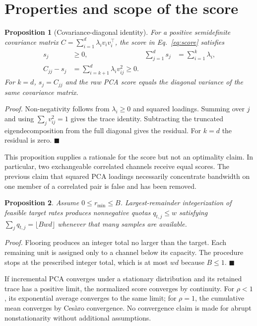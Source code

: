 \documentclass[12pt]{article}
\newtheorem{proposition}{Proposition}
\renewenvironment{proof}[1][Proof]{\noindent\textit{#1.}\space}{\hfill$\blacksquare$\par}
\begin{document}
\section{Properties and scope of the score}

\begin{proposition}[Covariance-diagonal identity]
For a positive semidefinite covariance matrix
$C=\sum_{i=1}^{d}\lambda_i v_iv_i^\top$, the score in
Eq.~\eqref{eq:score} satisfies
\begin{align}
 s_j&\geq0, & \sum_{j=1}^{d}s_j&=\sum_{i=1}^{k}\lambda_i,\\
 C_{jj}-s_j&=\sum_{i=k+1}^{d}\lambda_i v_{ij}^{2}\geq0.
\end{align}
For $k=d$, $s_j=C_{jj}$ and the raw PCA score equals the diagonal variance of the same covariance matrix.
\end{proposition}
\begin{proof}
Non-negativity follows from $\lambda_i\geq0$ and squared loadings. Summing over
$j$ and using $\sum_jv_{ij}^2=1$ gives the trace identity. Subtracting the
truncated eigendecomposition from the full diagonal gives the residual. For
$k=d$ the residual is zero.
\end{proof}

This proposition supplies a rationale for the score but not an optimality
claim. In particular, two exchangeable correlated channels receive equal
scores. The previous claim that squared PCA loadings necessarily concentrate
bandwidth on one member of a correlated pair is false and has been removed.

\begin{proposition}
Assume $0\leq r_{\min}\leq B$. Largest-remainder integerization of feasible
target rates produces nonnegative quotas $q_{t,j}\leq w$ satisfying
$\sum_jq_{t,j}=\lfloor Bwd\rfloor$ whenever that many samples are available.
\end{proposition}
\begin{proof}
Flooring produces an integer total no larger than the target. Each remaining
unit is assigned only to a channel below its capacity. The procedure stops at
the prescribed integer total, which is at most $wd$ because $B\leq1$.
\end{proof}

If incremental PCA converges under a stationary distribution and its retained
trace has a positive limit, the normalized score converges by continuity.
For $\rho<1$, its exponential average converges to the same limit; for
$\rho=1$, the cumulative mean converges by Ces\`aro convergence.
No convergence claim is made for abrupt nonstationarity without additional
assumptions.
\end{document}
